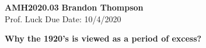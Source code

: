 \noindent
\textbf{AMH2020.03} \hfill \textbf{Brandon Thompson} \\
\normalsize Prof. Luck \hfill Due Date: 10/4/2020 \\

\begin{center}
\textbf{Why the 1920's is viewed as a period of excess?}
\end{center}